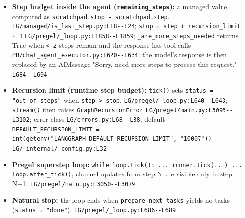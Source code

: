 \begin{itemize}
\item \textbf{Step budget inside the agent (\texttt{remaining\_\allowbreak{}steps}):} a managed value computed as \texttt{scratchpad.\allowbreak{}stop -\allowbreak{} scratchpad.\allowbreak{}step}. \texttt{LG/\allowbreak{}managed/\allowbreak{}is\_\allowbreak{}last\_\allowbreak{}step.\allowbreak{}py:\allowbreak{}L18-\allowbreak{}-\allowbreak{}L24}; \texttt{stop = step + recursion\_\allowbreak{}limit + 1} \texttt{LG/\allowbreak{}pregel/\allowbreak{}\_\allowbreak{}loop.\allowbreak{}py:\allowbreak{}L1858-\allowbreak{}-\allowbreak{}L1859}; \texttt{\_\allowbreak{}are\_\allowbreak{}more\_\allowbreak{}steps\_\allowbreak{}needed} returns True when \texttt{< 2} steps remain and the response has tool calls \texttt{PB/\allowbreak{}chat\_\allowbreak{}agent\_\allowbreak{}executor.\allowbreak{}py:\allowbreak{}L620-\allowbreak{}-\allowbreak{}L634}; the model's response is then replaced by an AIMessage "Sorry, need more steps to process this request." \texttt{L684-\allowbreak{}-\allowbreak{}L694}
\item \textbf{Recursion limit (runtime step budget):} \texttt{tick(\allowbreak{})} sets \texttt{status = "out\_\allowbreak{}of\_\allowbreak{}steps"} when \texttt{step > stop}. \texttt{LG/\allowbreak{}pregel/\allowbreak{}\_\allowbreak{}loop.\allowbreak{}py:\allowbreak{}L640-\allowbreak{}-\allowbreak{}L643}; \texttt{stream(\allowbreak{})} then raises \texttt{GraphRecursionError} \texttt{LG/\allowbreak{}pregel/\allowbreak{}main.\allowbreak{}py:\allowbreak{}L3093-\allowbreak{}-\allowbreak{}L3102}; error class \texttt{LG/\allowbreak{}errors.\allowbreak{}py:\allowbreak{}L68-\allowbreak{}-\allowbreak{}L88}; default \texttt{DEFAULT\_\allowbreak{}RECURSION\_\allowbreak{}LIMIT = int(\allowbreak{}getenv(\allowbreak{}"LANGGRAPH\_\allowbreak{}DEFAULT\_\allowbreak{}RECURSION\_\allowbreak{}LIMIT", "10007"))} \texttt{LG/\allowbreak{}\_\allowbreak{}internal/\allowbreak{}\_\allowbreak{}config.\allowbreak{}py:\allowbreak{}L32}
\item \textbf{Pregel superstep loop:} \texttt{while loop.\allowbreak{}tick(\allowbreak{}):\allowbreak{} .\allowbreak{}.\allowbreak{}.\allowbreak{} runner.\allowbreak{}tick(\allowbreak{}.\allowbreak{}.\allowbreak{}.\allowbreak{}) .\allowbreak{}.\allowbreak{}.\allowbreak{} loop.\allowbreak{}after\_\allowbreak{}tick(\allowbreak{})}; channel updates from step N are visible only in step N+1. \texttt{LG/\allowbreak{}pregel/\allowbreak{}main.\allowbreak{}py:\allowbreak{}L3050-\allowbreak{}-\allowbreak{}L3079}
\item \textbf{Natural stop:} the loop ends when \texttt{prepare\_\allowbreak{}next\_\allowbreak{}tasks} yields no tasks (\texttt{status = "done"}). \texttt{LG/\allowbreak{}pregel/\allowbreak{}\_\allowbreak{}loop.\allowbreak{}py:\allowbreak{}L686-\allowbreak{}-\allowbreak{}L689}

\end{itemize}
